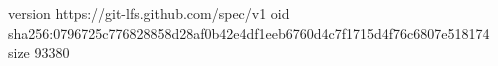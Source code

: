 version https://git-lfs.github.com/spec/v1
oid sha256:0796725c776828858d28af0b42e4df1eeb6760d4c7f1715d4f76c6807e518174
size 93380
